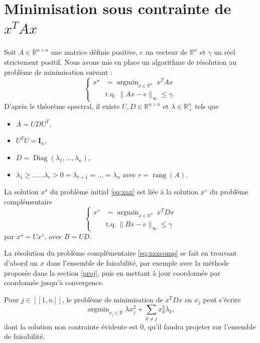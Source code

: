 \documentclass[12pt,a4paper]{reedthesis}
\newcommand \RR {\mathbb{R}}
\DeclareMathOperator*{\argmin}{argmin}
\DeclareMathOperator*{\diag}{Diag}
\DeclareMathOperator*{\rang}{rang}
\theoremstyle{definition}
\theoremstyle{definition}
\theoremstyle{definition}
\theoremstyle{remark}
\begin{document}
\hypertarget{mam}{%
\section{\texorpdfstring{Minimisation sous contrainte de \(x^TAx\)}{Minimisation sous contrainte de x\^{}TAx}}\label{mam}}

Soit \(A \in \RR^{n\times n}\) une matrice définie positive, \(e\) un vecteur de \(\RR^n\) et \(\gamma\) un réel strictement positif. Nous avons mis en place un algorithme de résolution au problème de minimisation suivant :
\begin{equation}
\label{eq:xax}
\left\{
  \begin{aligned}
    x^\star & = \argmin_{x \in \mathbb{R}^{n}} \ x^TAx \\
    &\text{t.q. }\|Ax - e\|_{\infty} \leq \gamma.
  \end{aligned}
\right.
\end{equation}
D'après le théorème spectral, il existe \(U, D \in \RR^{n\times n}\) et \(\lambda \in \RR_+^n\) tels que
\begin{itemize}
\item
  \(A = UDU^T\),
\item
  \(U^TU = \mathbf{I}_n\),
\item
  \(D = \diag\left(\lambda_1, \ldots, \lambda_n\right)\),
\item
  \(\lambda_1 \geq \dots ... \lambda_r > 0 = \lambda_{r+1} = \dots = \lambda_{n}\) avec \(r = \rang(A)\).
\end{itemize}
La solution \(x^{\star}\) du problème initial \eqref{eq:xax} est liée à la solution \(x^{\diamond}\) du problème complémentaire
\begin{equation}
\label{eq:xaxcomp}
\left\{
  \begin{aligned}
    x^\diamond & = \argmin_{x \in \mathbb{R}^{n}} \ x^TDx \\
    &\text{t.q.}\  \|Bx - e\|_{\infty} \leq \gamma
  \end{aligned}
\right.
\end{equation}
par \(x^\star = Ux^\diamond\), avec \(B = UD\).

La résolution du problème complémentaire \eqref{eq:xaxcomp} se fait en trouvant d'abord un \(x\) dans l'ensemble de faisabilité, par exemple avec la méthode proposée dans la section \ref{proj}, puis en mettant à jour coordonnée par coordonnée jusqu'à convergence.

Pour \(j \in [\![1,n]\!]\), le problème de minimisation de \(x^TDx\) en \(x_j\) peut s'écrire
\begin{equation*}
\argmin_{x_j \in \RR} \lambda x_j^2 + \sum_{k\neq j}x_k^2\lambda_k,
\end{equation*}
dont la solution non contrainte évidente est \(0\), qu'il faudra projeter sur l'ensemble de faisabilité.
\end{document}
